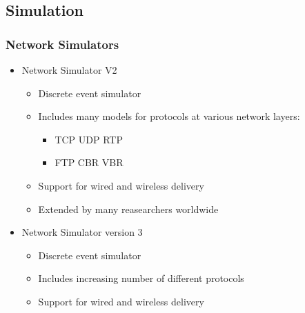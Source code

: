 \subsection{Simulation}
\subsubsection{Network Simulators}
\begin{itemize}
	\item Network Simulator V2
	\begin{itemize}
		\item Discrete event simulator
		\item Includes many models for protocols at various
			network layers:
		\begin{itemize}
			\item TCP UDP RTP
			\item FTP CBR VBR
		\end{itemize}
	\item Support for wired and wireless delivery
	\item Extended by many reasearchers worldwide
	\end{itemize}
	\item Network Simulator version 3
	\begin{itemize}
		\item Discrete event simulator
		\item Includes increasing number of different protocols
		\item Support for wired and wireless delivery
	\end{itemize}
\end{itemize}
